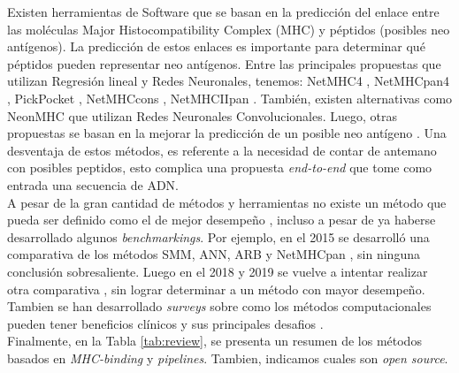 Existen herramientas de Software que se basan en la predicción del enlace entre las moléculas Major Histocompatibility Complex (MHC) y péptidos (posibles neo antígenos). La predicción de estos enlaces es importante para determinar qué péptidos pueden representar neo antígenos. Entre las principales propuestas que utilizan Regresión lineal y Redes Neuronales, tenemos: NetMHC4 \citep{stevanovic2017landscape}, NetMHCpan4 \citep{robbins2013mining}, PickPocket \citep{tran2014cancer}, NetMHCcons \citep{castle2012exploiting}, NetMHCIIpan \citep{yadav2014predicting}. También, existen alternativas como NeonMHC \citep{van2013tumor} que utilizan Redes Neuronales Convolucionales. Luego, otras propuestas se basan en la mejorar la predicción de un posible neo antígeno \citep{lu2021deep, hao2021improvement, lang2021neofox, chen2021identification, yang2021deepnetbim, li2021deepimmuno}.  Una desventaja de estos métodos, es referente a la necesidad de contar de antemano con posibles peptidos, esto complica una propuesta \textit{end-to-end} que tome como entrada una secuencia de ADN.\\



A pesar de la gran cantidad de métodos y herramientas no existe un método que pueda ser definido como el de mejor desempeño \citep{de2020neoantigen}, incluso a pesar de ya haberse desarrollado algunos \textit{benchmarkings}. Por ejemplo, en el 2015 se desarrolló una comparativa de los métodos SMM, ANN, ARB y NetMHCpan \citep{trolle2015automated}, sin ninguna conclusión sobresaliente. Luego en el 2018 y 2019 se vuelve a intentar realizar otra comparativa \citep{bonsack2019performance, zhao2018systematically}, sin lograr determinar a un método con mayor desempeño. Tambien se han desarrollado \textit{surveys} sobre como los métodos computacionales pueden tener beneficios clínicos \citep{de2020neoantigen} y sus principales desafios \citep{chen2021challenges}. \\

Finalmente, en la Tabla \ref{tab:review}, se presenta un resumen de los métodos basados en \textit{MHC-binding} y \textit{pipelines}. Tambien, indicamos cuales son \textit{open source}.\\

